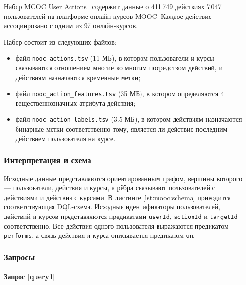 Набор MOOC User Actions~\cite{mooc} содержит данные о 411\,749 действиях 7\,047 пользователей на платформе
онлайн-курсов MOOC. Каждое действие ассоциировано с одним из 97 онлайн-курсов.

Набор состоит из следующих файлов:
\begin{itemize}
    \item файл \texttt{mooc\_actions.tsv} (11 МБ), в котором пользователи и курсы связываются отношением многие ко многим
посредством действий, и действиям назначаются временные метки;
    \item файл \texttt{mooc\_action\_features.tsv} (35 МБ), в котором определяются 4 вещественнозначных атрибута
действия;
    \item файл \texttt{mooc\_action\_labels.tsv} (3.5 МБ), в котором действиям назначаются бинарные метки соответственно
тому, является ли действие последним действием пользователя на курсе.
\end{itemize}

\subsubsection{Интерпретация и схема}

Исходные данные представляются ориентированным графом, вершины которого --- пользователи, действия и курсы, а рёбра
связывают пользователей с действиями и действия с курсами. В листинге \ref{lst:mooc:schema} приводится соответствующая
DQL-схема. Исходные идентификаторы пользователей, действий и курсов представляются предикатами \texttt{userId}, \texttt{actionId} и
\texttt{targetId} соответственно. Все действия одного пользователя выражаются предикатом \texttt{performs}, а связь
действия и курса описывается предикатом \texttt{on}.


\subsubsection{Запросы}

\paragraph{Запрос \ref{query1}}

